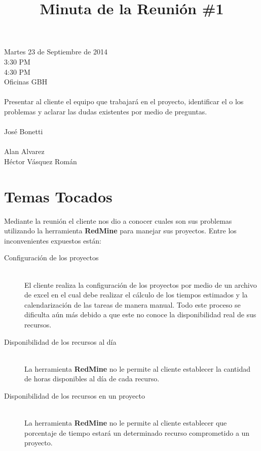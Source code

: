 \documentclass{article}
\begin{document}
\title{\bfseries Minuta de la Reuni\'{o}n \#1}
\date{}
\maketitle

 Martes 23 de Septiembre de 2014\\
 3:30 PM\\
 4:30 PM\\
 Oficinas GBH\\[0.3in]
\\[0.15in] Presentar al cliente el equipo que trabajar\'{a} en el proyecto, identificar el o los problemas y
aclarar las dudas existentes por medio de preguntas.\\[0.3in]
\\
\indent Jos\'{e} Bonetti\\[0.3in]
\\
\indent Alan Alvarez\\
\indent H\'{e}ctor V\'{a}squez Rom\'{a}n
\section{Temas Tocados}
Mediante la reuni\'{o}n el cliente nos dio a conocer cuales son sus problemas utilizando la herramienta \textbf{RedMine} para manejar sus proyectos.
Entre los inconvenientes expuestos est\'{a}n:
\begin{description}
\item[Configuraci\'{o}n de los proyectos] \hfill \\
El cliente realiza la configuraci\'{o}n de los proyectos por medio de un archivo de excel en el cual debe realizar
el c\'{a}lculo de los tiempos estimados y la calendarizaci\'{o}n de las tareas de manera manual. Todo este proceso se dificulta a\'{u}n m\'{a}s debido a que
este no conoce la disponibilidad real de sus recursos.
\item[Disponibilidad de los recursos al d\'{i}a] \hfill \\
La herramienta \textbf{RedMine} no le permite al cliente establecer la cantidad de horas disponibles al d\'{i}a de cada recurso.
\item[Disponibilidad de los recursos en un proyecto] \hfill \\
La herramienta \textbf{RedMine} no le permite al cliente establecer que porcentaje de tiempo estar\'{a} un determinado recurso comprometido a un proyecto.
\end{description}
\end{document}
